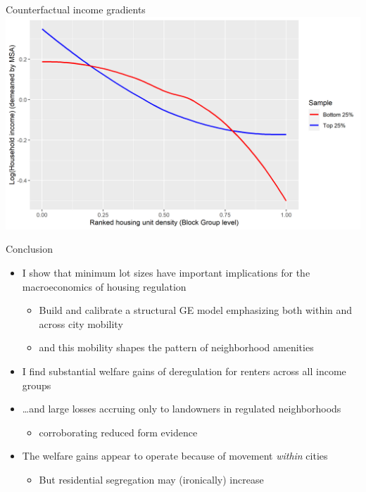 \documentclass{beamer}
\begin{document}
\begin{frame}{Counterfactual income gradients}\label{Ctfl_Income_gradient}
		\includegraphics[width=\textwidth]{Income_dist_ctfcl.png}
			\hyperlink{Fact1}{} 
\end{frame}

\begin{frame}{Conclusion}
	\begin{itemize}
		\color{black}
		\itemsep1em
		\item I show that minimum lot sizes have important implications for the macroeconomics of housing regulation
		\begin{itemize}
			\item Build and calibrate a structural GE model emphasizing both within and across city mobility
			
			\item and this mobility shapes the pattern of neighborhood amenities
		\end{itemize}
		
		\item I find substantial welfare gains of deregulation for renters across all income groups
		
		\item \dots and large losses accruing \color{red} only \color{black} to landowners in regulated neighborhoods
		\begin{itemize}
			\item corroborating reduced form evidence
		\end{itemize}
		
		\item The welfare gains appear to operate because of movement \textit{within} cities
		\begin{itemize}
			\item But residential segregation may (ironically) increase
		\end{itemize}
	\end{itemize}
\end{frame}
\end{document}
